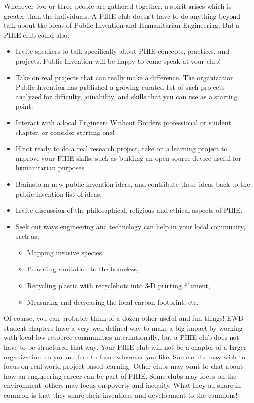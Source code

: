 \documentclass[
	fontsize=10pt, %
	twoside=false, %
	secnumdepth=1, %
]{kaobook}
\begin{document}
Whenever two or three people are gathered together, a spirit arises which is greater than the individuals. A PIHE club doesn’t have to do anything beyond talk about the ideas of Public Invention and Humanitarian Engineering. But a PIHE club could also:
\begin{itemize}
\item Invite speakers to talk specifically about PIHE concepts, practices, and projects. Public Invention will be happy to come speak at your club!
\item Take on real projects that can really make a difference. The organization Public Invention has published a growing curated list of such projects analyzed for difficulty, joinability, and skills that you can use as a starting point.
\item Interact with a local Engineers Without Borders professional or student chapter, or consider starting one!
\item If not ready to do a real research project, take on a learning project to improve your PIHE skills, such as building an open-source device useful for humanitarian purposes.
\item Brainstorm new public invention ideas, and contribute those ideas back to the public invention list of ideas.
\item Invite discussion of the philosophical, religious and ethical aspects of PIHE.
\item Seek out ways engineering and technology can help in your local community, such as:
  \begin{itemize}
  \item Mapping invasive species,
  \item Providing sanitation to the homeless,
  \item Recycling plastic with recyclebots into 3-D printing filament,
  \item Measuring and decreasing the local carbon footprint, etc.
  \end{itemize}
\end{itemize}

Of course, you can probably think of a dozen other useful and fun
things! EWB student chapters have a very well-defined way to make a
big impact by working with local low-resource communities
internationally, but a PIHE club does not have to be structured that
way. Your PIHE club will not be a chapter of a larger organization, so
you are free to focus wherever you like. Some clubs may wish to focus
on real-world project-based learning. Other clubs may want to chat
about how an engineering career can be part of PIHE. Some clubs may
focus on the environment, others may focus on poverty and
inequity. What they all share in common is that they share their
inventions and development to the commons!
\end{document}
